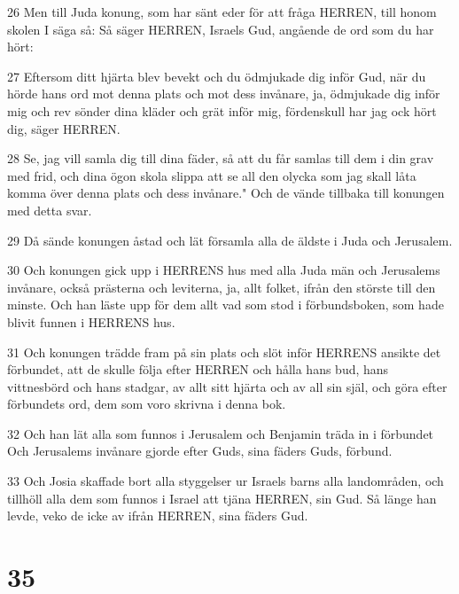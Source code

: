\par 26 Men till Juda konung, som har sänt eder för att fråga HERREN, till honom skolen I säga så: Så säger HERREN, Israels Gud, angående de ord som du har hört:
\par 27 Eftersom ditt hjärta blev bevekt och du ödmjukade dig inför Gud, när du hörde hans ord mot denna plats och mot dess invånare, ja, ödmjukade dig inför mig och rev sönder dina kläder och grät inför mig, fördenskull har jag ock hört dig, säger HERREN.
\par 28 Se, jag vill samla dig till dina fäder, så att du får samlas till dem i din grav med frid, och dina ögon skola slippa att se all den olycka som jag skall låta komma över denna plats och dess invånare." Och de vände tillbaka till konungen med detta svar.
\par 29 Då sände konungen åstad och lät församla alla de äldste i Juda och Jerusalem.
\par 30 Och konungen gick upp i HERRENS hus med alla Juda män och Jerusalems invånare, också prästerna och leviterna, ja, allt folket, ifrån den störste till den minste. Och han läste upp för dem allt vad som stod i förbundsboken, som hade blivit funnen i HERRENS hus.
\par 31 Och konungen trädde fram på sin plats och slöt inför HERRENS ansikte det förbundet, att de skulle följa efter HERREN och hålla hans bud, hans vittnesbörd och hans stadgar, av allt sitt hjärta och av all sin själ, och göra efter förbundets ord, dem som voro skrivna i denna bok.
\par 32 Och han lät alla som funnos i Jerusalem och Benjamin träda in i förbundet Och Jerusalems invånare gjorde efter Guds, sina fäders Guds, förbund.
\par 33 Och Josia skaffade bort alla styggelser ur Israels barns alla landområden, och tillhöll alla dem som funnos i Israel att tjäna HERREN, sin Gud. Så länge han levde, veko de icke av ifrån HERREN, sina fäders Gud.

\chapter{35}

